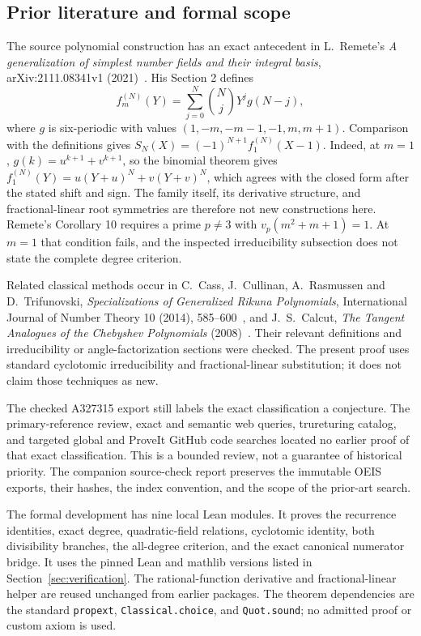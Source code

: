 \subsection{Prior literature and formal scope}

The source polynomial construction has an exact antecedent in
L.~Remete's \emph{A generalization of simplest number fields and their
integral basis}, arXiv:2111.08341v1 (2021)~\cite{Remete}.  His Section 2 defines
\[
 f_m^{(N)}(Y)=\sum_{j=0}^N\binom NjY^j g(N-j),
\]
where $g$ is six-periodic with values
$(1,-m,-m-1,-1,m,m+1)$.  Comparison with the definitions gives
$S_N(X)=(-1)^{N+1}f_1^{(N)}(X-1)$.
Indeed, at $m=1$, $g(k)=u^{k+1}+v^{k+1}$, so the binomial theorem gives
$f_1^{(N)}(Y)=u(Y+u)^N+v(Y+v)^N$, which agrees with the closed form
after the stated shift and sign.
The family itself, its derivative structure, and fractional-linear
root symmetries are therefore not new constructions here.
Remete's Corollary 10 requires a prime $p\ne3$ with
$v_p(m^2+m+1)=1$.  At $m=1$ that condition fails, and the inspected
irreducibility subsection does not state the complete degree criterion.

Related classical methods occur in C.~Cass, J.~Cullinan,
A.~Rasmussen and D.~Trifunovski, \emph{Specializations of Generalized
Rikuna Polynomials}, International Journal of Number Theory 10 (2014),
585--600~\cite{Rikuna}, and J.~S.~Calcut, \emph{The Tangent Analogues of the Chebyshev
Polynomials} (2008)~\cite{Calcut}.  Their relevant definitions and irreducibility or
angle-factorization sections were checked.  The present proof uses
standard cyclotomic irreducibility and fractional-linear substitution;
it does not claim those techniques as new.

The checked A327315 export still labels the exact classification a
conjecture.  The primary-reference review, exact and semantic web
queries, trureturing catalog, and targeted global and ProveIt GitHub
code searches located no earlier proof of that exact classification.
This is a bounded review, not a guarantee of historical priority.
The companion source-check report preserves the immutable OEIS exports,
their hashes, the index convention, and the scope of the prior-art search.

The formal development has nine local Lean modules.  It proves the
recurrence identities, exact degree, quadratic-field relations,
cyclotomic identity, both divisibility branches, the all-degree
criterion, and the exact canonical numerator bridge.  It uses the pinned Lean and mathlib versions
listed in Section~\ref{sec:verification}.
The rational-function derivative and fractional-linear helper are
reused unchanged from earlier packages.  The theorem dependencies are
the standard \texttt{propext}, \texttt{Classical.choice}, and
\texttt{Quot.sound}; no admitted proof or custom axiom is used.

